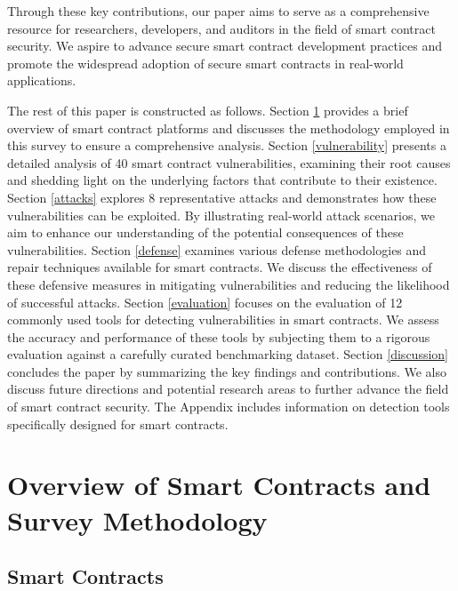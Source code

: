 \documentclass[manuscript,screen]{acmart}
\begin{document}
Through these key contributions, our paper aims to serve as a comprehensive resource for researchers, developers, and auditors in the field of smart contract security. We aspire to advance secure smart contract development practices and promote the widespread adoption of secure smart contracts in real-world applications.

The rest of this paper is constructed as follows. Section \ref{Overview} provides a brief overview of smart contract platforms and discusses the methodology employed in this survey to ensure a comprehensive analysis. Section \ref{vulnerability} presents a detailed analysis of 40 smart contract vulnerabilities, examining their root causes and shedding light on the underlying factors that contribute to their existence. Section \ref{attacks} explores 8 representative attacks and demonstrates how these vulnerabilities can be exploited. By illustrating real-world attack scenarios, we aim to enhance our understanding of the potential consequences of these vulnerabilities. Section \ref{defense} examines various defense methodologies and repair techniques available for smart contracts. We discuss the effectiveness of these defensive measures in mitigating vulnerabilities and reducing the likelihood of successful attacks. Section \ref{evaluation} focuses on the evaluation of 12 commonly used tools for detecting vulnerabilities in smart contracts. We assess the accuracy and performance of these tools by subjecting them to a rigorous evaluation against a carefully curated benchmarking dataset. Section \ref{discussion} concludes the paper by summarizing the key findings and contributions. We also discuss future directions and potential research areas to further advance the field of smart contract security. The Appendix includes information on detection tools specifically designed for smart contracts.



\section{Overview of Smart Contracts and Survey Methodology}
\label{Overview}
\subsection{Smart Contracts}
\end{document}

